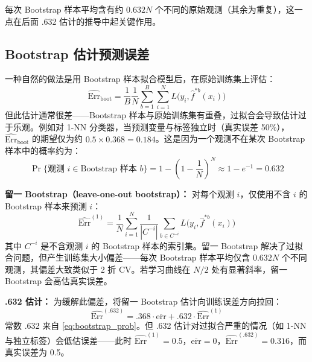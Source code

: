 每次 Bootstrap 样本平均含有约 $0.632N$ 个不同的原始观测（其余为重复），这一点在后面 .632 估计的推导中起关键作用。

\subsection{Bootstrap 估计预测误差}

一种自然的做法是用 Bootstrap 样本拟合模型后，在原始训练集上评估：
\begin{equation}\label{eq:Err_boot}
    \widehat{\mathrm{Err}}_{\text{boot}} = \frac{1}{B}\frac{1}{N}\sum_{b=1}^{B}\sum_{i=1}^{N} L\bigl(y_i, \hat{f}^{*b}(x_i)\bigr)
\end{equation}
但此估计通常很差——Bootstrap 样本与原始训练集有重叠，过拟合会导致估计过于乐观。例如对 1-NN 分类器，当预测变量与标签独立时（真实误差 50\%），$\widehat{\mathrm{Err}}_{\text{boot}}$ 的期望仅为约 $0.5 \times 0.368 = 0.184$。这是因为一个观测不在某次 Bootstrap 样本中的概率约为：
\begin{equation}\label{eq:bootstrap_prob}
    \Pr\{\text{观测 } i \in \text{Bootstrap 样本 } b\} = 1 - \left(1 - \frac{1}{N}\right)^N \approx 1 - e^{-1} = 0.632
\end{equation}

\textbf{留一 Bootstrap（leave-one-out bootstrap）：} 对每个观测 $i$，仅使用不含 $i$ 的 Bootstrap 样本来预测 $i$：
\begin{equation}\label{eq:Err_1}
    \widehat{\mathrm{Err}}^{(1)} = \frac{1}{N}\sum_{i=1}^{N} \frac{1}{|C^{-i}|}\sum_{b \in C^{-i}} L\bigl(y_i, \hat{f}^{*b}(x_i)\bigr)
\end{equation}
其中 $C^{-i}$ 是不含观测 $i$ 的 Bootstrap 样本的索引集。留一 Bootstrap 解决了过拟合问题，但产生训练集大小偏差——每次 Bootstrap 样本平均仅含 $0.632N$ 个不同观测，其偏差大致类似于 2 折 CV。若学习曲线在 $N/2$ 处有显著斜率，留一 Bootstrap 会高估真实误差。

\textbf{.632 估计：} 为缓解此偏差，将留一 Bootstrap 估计向训练误差方向拉回：
\begin{equation}\label{eq:Err_632}
    \widehat{\mathrm{Err}}^{(.632)} = .368\cdot\overline{\mathrm{err}} + .632\cdot\widehat{\mathrm{Err}}^{(1)}
\end{equation}
常数 .632 来自 \eqref{eq:bootstrap_prob}。但 .632 估计对过拟合严重的情况（如 1-NN 与独立标签）会低估误差——此时 $\widehat{\mathrm{Err}}^{(1)} = 0.5$，$\overline{\mathrm{err}}=0$，$\widehat{\mathrm{Err}}^{(.632)} = 0.316$，而真实误差为 0.5。

